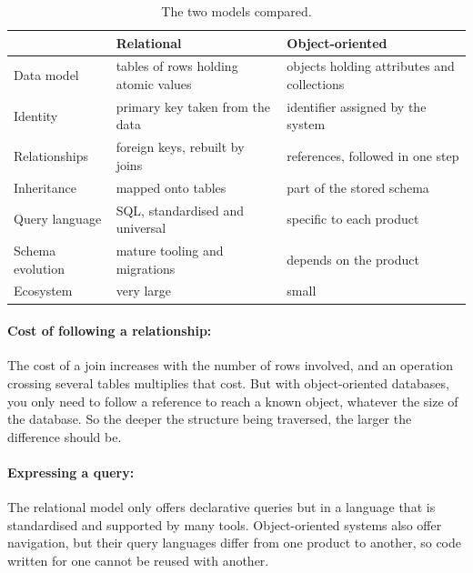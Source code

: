 \documentclass{article}
\begin{document}
\begin{table}[htbp]
    \centering
    \begin{tabular}{|l|p{4.3cm}|p{4.3cm}|}
        \hline
        & \textbf{Relational}                  & \textbf{Object-oriented}                   \\
        \hline
        Data model       & tables of rows holding atomic values & objects holding attributes and collections \\
        \hline
        Identity         & primary key taken from the data      & identifier assigned by the system          \\
        \hline
        Relationships    & foreign keys, rebuilt by joins       & references, followed in one step           \\
        \hline
        Inheritance      & mapped onto tables                   & part of the stored schema                  \\
        \hline
        Query language   & SQL, standardised and universal      & specific to each product                   \\
        \hline
        Schema evolution & mature tooling and migrations        & depends on the product                     \\
        \hline
        Ecosystem        & very large                           & small                                      \\
        \hline
    \end{tabular}
    \caption{The two models compared.}
    \label{tab:comparison}
\end{table}

\paragraph{Cost of following a relationship:} The cost of a join increases with the
number of rows involved, and an operation crossing several tables multiplies that
cost. But with object-oriented databases, you only need to follow a reference to reach a known object, whatever the size of
the database. So the deeper the structure being traversed, the larger the difference should be.

\paragraph{Expressing a query:} The relational model only offers declarative
queries but in a language that is standardised and supported by many tools.
Object-oriented systems also offer navigation, but their query languages differ from one product to another, so
code written for one cannot be reused with another.
\end{document}
